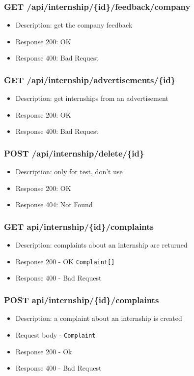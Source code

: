 \subsubsection{GET /api/internship/\{id\}/feedback/company}
\begin{itemize}
    \item Description: get the company feedback
    \item Response 200: OK
    \item Response 400: Bad Request
\end{itemize}

\subsubsection{GET /api/internship/advertisements/\{id\}}
\begin{itemize}
    \item Description: get internships from an advertisement
    \item Response 200: OK
    \item Response 400: Bad Request
\end{itemize}

\subsubsection{POST /api/internship/delete/\{id\}}
\begin{itemize}
    \item Description: only for test, don't use
    \item Response 200: OK
    \item Response 404: Not Found
\end{itemize}

\subsubsection{GET api/internship/\{id\}/complaints}
\begin{itemize}
    \item Description: complaints about an internship are returned
    \item Response 200 - OK \verb|Complaint[]|
    \item Response 400 - Bad Request
\end{itemize}

\subsubsection{POST api/internship/\{id\}/complaints}
\begin{itemize}
    \item Description: a complaint about an internship is created
    \item Request body - \verb|Complaint|
    \item Response 200 - Ok
    \item Response 400 - Bad Request
\end{itemize}

